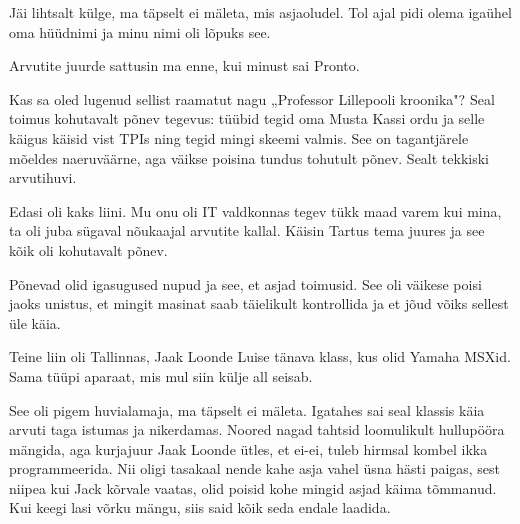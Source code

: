 \label{sisu:pronto}


Jäi lihtsalt külge, ma täpselt ei mäleta, mis asjaoludel. Tol 
ajal pidi olema igaühel oma hüüdnimi ja minu nimi oli lõpuks see.


Arvutite juurde sattusin ma enne, kui minust sai Pronto.

Kas sa oled lugenud sellist raamatut nagu „Professor Lillepooli 
kroonika"? 
Seal toimus kohutavalt põnev tegevus: tüübid tegid oma Musta Kassi 
ordu ja selle käigus käisid vist TPIs ning tegid mingi skeemi 
valmis. See on tagantjärele mõeldes naeruväärne, aga väikse poisina tundus 
tohutult põnev. Sealt tekkiski arvutihuvi. 

Edasi oli kaks liini. Mu onu oli IT valdkonnas tegev 
tükk maad varem kui mina, ta oli juba sügaval 
nõukaajal arvutite kallal. Käisin Tartus tema juures ja see kõik oli kohutavalt põnev.


Põnevad olid igasugused nupud ja see, et asjad toimusid. 
See oli väikese poisi jaoks unistus, et mingit masinat saab täielikult kontrollida ja et jõud võiks sellest üle käia.

Teine liin oli Tallinnas, Jaak 
Loonde Luise tänava klass, kus olid Yamaha 
MSXid. Sama tüüpi aparaat, mis mul siin külje all 
seisab.


See oli pigem huvialamaja, ma täpselt ei mäleta. Igatahes sai seal klassis käia arvuti taga istumas ja nikerdamas. Noored nagad tahtsid 
loomulikult hullupööra mängida, aga kurjajuur Jaak Loonde
ütles, et ei-ei, tuleb hirmsal kombel ikka programmeerida. Nii oligi 
tasakaal nende kahe asja vahel üsna hästi paigas, sest niipea kui 
Jack kõrvale vaatas, olid poisid kohe mingid asjad käima tõmmanud. Kui 
keegi lasi võrku mängu, siis said kõik seda endale laadida. 

